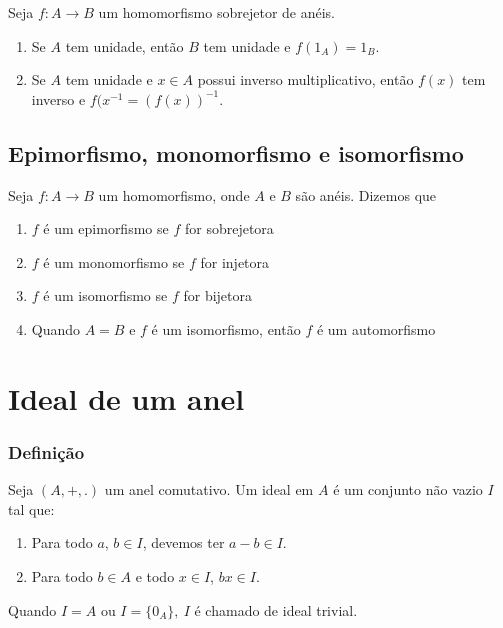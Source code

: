 \begin{proposicao}
	Seja $f : A \to B$ um homomorfismo sobrejetor de anéis.
	\begin{enumerate}
		\item Se $A$ tem unidade, então $B$ tem unidade e $f(1_A) = 1_B$.
		\item Se $A$ tem unidade e $x \in A$ possui inverso multiplicativo, então $f(x)$ tem inverso e $f(x^{-1} = (f(x))^{-1}$.
	\end{enumerate}
\end{proposicao}

\subsection{Epimorfismo, monomorfismo e isomorfismo}
\begin{definicao} Seja $f:A\rightarrow B$ um homomorfismo, onde $A$ e $B$ s{\~a}o an{\'e}is. Dizemos que
\begin{enumerate}
\item $f$ {\'e} um epimorfismo se $f$ for sobrejetora
\item $f$ {\'e} um monomorfismo se $f$ for injetora
\item $f$ {\'e} um isomorfismo se $f$ for bijetora
\item Quando $A=B$ e $f$ {\'e} um isomorfismo, ent{\~a}o $f$ {\'e} um automorfismo
\end{enumerate}
\end{definicao}

\section{Ideal de um anel}
\subsubsection{Defini{\c c}{\~a}o}
\begin{definicao} Seja $(A,+,.)$ um anel comutativo. Um ideal em $A$ {\'e} um conjunto n{\~a}o vazio $I$ tal que:
\begin{enumerate}
\item Para todo $a$, $b\in I$, devemos ter $a - b \in I$.
\item Para todo $b\in A$ e todo $x \in I$, $bx \in I$.
\end{enumerate}
\end{definicao}

Quando $I=A$ ou $I=\{0_{A}\},\ I$ {\'e} chamado de ideal trivial.

